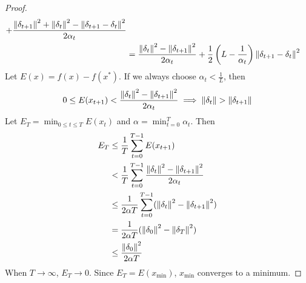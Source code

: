 \begin{proof}
\begin{align*}
+ \frac{\left\lVert \delta_{t+1} \right\rVert^2 + \left\lVert \delta_t \right\rVert^2 - \left\lVert \delta_{t+1} - \delta_t \right\rVert^2}{2\alpha_t}
\\ &= \frac{\left\lVert \delta_t \right\rVert^2 - \left\lVert \delta_{t+1} \right\rVert^2}{2\alpha_t}
+ \frac{1}{2}\left(L - \frac{1}{\alpha_t}\right)\left\lVert \delta_{t+1}-\delta_t \right\rVert^2
\end{align*}
Let $E(x) = f(x) - f(x^*)$. If we always choose $\alpha_t < \frac{1}{L}$, then
\[ 0 \le E(x_{t+1}) < \frac{\left\lVert \delta_t \right\rVert^2 - \left\lVert \delta_{t+1} \right\rVert^2}{2\alpha_t}
\implies \left\lVert \delta_t \right\rVert > \left\lVert \delta_{t+1} \right\rVert \]
Let $E_T = \min_{0 \le t \le T} E(x_t)$ and $\alpha = \min_{t=0}^T \alpha_t$. Then
\begin{align*}
E_T &\le \frac{1}{T} \sum_{t=0}^{T-1} E(x_{t+1})
\\ &< \frac{1}{T} \sum_{t=0}^{T-1} \frac{\left\lVert \delta_t \right\rVert^2 - \left\lVert \delta_{t+1} \right\rVert^2}{2\alpha_t}
\\ &\le \frac{1}{2\alpha T} \sum_{t=0}^{T-1} (\left\lVert \delta_t \right\rVert^2 - \left\lVert \delta_{t+1} \right\rVert^2)
\\ &= \frac{1}{2\alpha T} (\left\lVert \delta_0 \right\rVert^2 - \left\lVert \delta_T \right\rVert^2)
\\ &\le \frac{\left\lVert \delta_0 \right\rVert^2}{2\alpha T}
\end{align*}
When $T \rightarrow \infty$, $E_T \rightarrow 0$.
Since $E_T = E(x_{\textrm{min}})$, $x_{\textrm{min}}$ converges to a minimum.
\end{proof}


